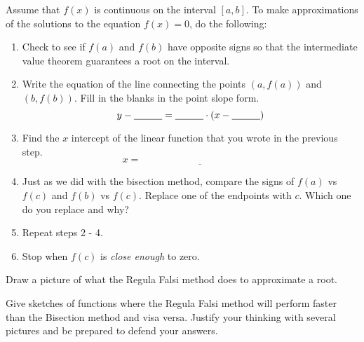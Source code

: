 \begin{algorithm}
    Assume that $f(x)$ is continuous on the interval $[a,b]$. To make approximations of
    the solutions to the equation $f(x) = 0$, do the following:
    \begin{enumerate}
        \item Check to see if $f(a)$ and $f(b)$ have opposite signs so that the
            intermediate value theorem guarantees a root on the interval.
        \item Write the equation of the line connecting the points $(a,f(a))$ and
            $(b,f(b))$. Fill in the blanks in the point slope form.
            \[ y - \underline{\hspace{0.4in}} = \underline{\hspace{0.4in}} \cdot \left(
                x - \underline{\hspace{0.4in}} \right) \]
            \solution{
                \[ y - f(a) = \left( \frac{f(b) - f(a)}{b-a} \right) \left( x-a
                    \right) \]
            }
        \item Find the $x$ intercept of the linear function that you wrote in the previous
            step.
            \[ x = \underline{\hspace{2in}} \]
            \solution{
                \[ 0 - f(a) = \left( \frac{f(b) - f(a)}{b-a} \right) \left( x-a
                    \right) \implies x = a+ \left( \frac{-f(a) (b-a)}{f(b)-f(a)} \right) \]
            }
        \item Just as we did with the bisection method, compare the signs of $f(a)$ vs
            $f(c)$ and $f(b)$ vs $f(c)$.  Replace one of the endpoints with $c$. Which one
            do you replace and why?
        \item Repeat steps 2 - 4.
        \item Stop when $f(c)$ is {\it close enough} to zero.
    \end{enumerate}
\end{algorithm}

\begin{problem}
    Draw a picture of what the Regula Falsi method does to approximate a root.
\end{problem}


\begin{problem}
    Give sketches of functions where the Regula Falsi method will perform faster than the
    Bisection method and visa versa.  Justify your thinking with several pictures and be
    prepared to defend your answers.
\end{problem}

